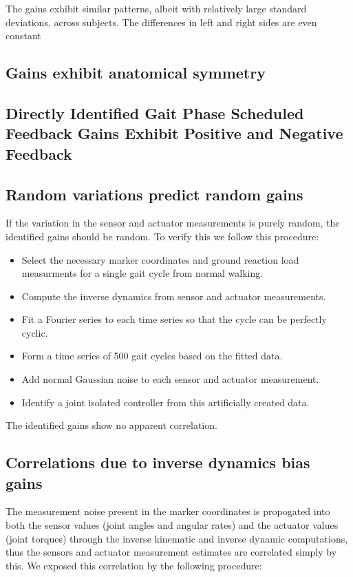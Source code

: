 \documentclass{article}
\begin{document}
The gains exhibit similar patterns, albeit with relatively large standard
deviations, across subjects. The differences in left and right sides are even
constant

\subsection*{Gains exhibit anatomical symmetry}
%

\subsection{Directly Identified Gait Phase Scheduled Feedback Gains Exhibit Positive
  and Negative Feedback}
%

\subsection*{Random variations predict random gains}
%
If the variation in the sensor and actuator measurements is purely random, the
identified gains should be random. To verify this we follow this procedure:

\begin{itemize}
  \item Select the necessary marker coordinates and ground reaction load
    measurments for a single gait cycle from normal walking.
  \item Compute the inverse dynamics from sensor and actuator measurements.
  \item Fit a Fourier series to each time series so that the cycle can be
    perfectly cyclic.
  \item Form a time series of 500 gait cycles based on the fitted data.
  \item Add normal Gaussian noise to each sensor and actuator measurement.
  \item Identify a joint isolated controller from this artificially created
    data.
\end{itemize}

The identified gains show no apparent correlation.


\subsection*{Correlations due to inverse dynamics bias gains}
%
The measurement noise present in the marker coordinates is propogated into both
the sensor values (joint angles and angular rates) and the actuator values
(joint torques) through the inverse kinematic and inverse dynamic computations,
thus the sensors and actuator measurement estimates are correlated simply by
this. We exposed this correlation by the following procedure:
\end{document}
